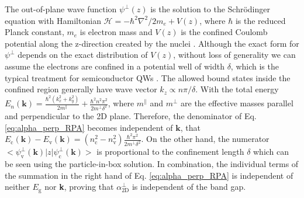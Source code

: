\documentclass[manuscript=suppinfo,email=true,hyperref=true,keywords=false]{achemso}
\begin{document}
The out-of-plane wave function $\psi^{\perp}(z)$ is the solution to the Schr\"{o}dinger equation with
Hamiltonian $\mathcal{H} = -\hbar^{2} \nabla^{2}/2m_{e} + V(z)$, where
$\hbar$ is the reduced Planck constant, $m_{e}$ is electron mass and
$V(z)$ is the confined Coulomb potential along the z-direction
created by the nuclei
\cite{davies_physics_1997,ihn_semiconductor_2009}. Although the exact
form for $\psi^{\perp}$ depends on the exact distribution of $V(z)$,
without loss of generality we can assume the electrons are confined in
a potential well of width $\delta$, which is the typical treatment for
semiconductor QWs \cite{ihn_semiconductor_2009,Fowler_1984,Maize_2011}. 
The allowed bound
states inside the confined region generally have wave vector
$k_{z} \propto n \pi / \delta$. With the total energy
$E_{n}(\mathbf{k}) = {\displaystyle \frac{\hbar^{2} (k_{x}^{2} +
    k_{y}^{2})}{2 m^{\parallel}} + \frac{\hbar^{2} n^{2} \pi^{2}}{2
    m^{\perp} \delta^{2}}}$, where $m^{\parallel}$ and $m^{\perp}$ are
the effective masses parallel and perpendicular to the 2D
plane. Therefore, the denominator of Eq. \ref{eq:alpha_perp_RPA} becomes independent of
$\mathbf{k}$, that
$E_{\mathrm{c}}(\mathbf{k}) - E_{\mathrm{v}}(\mathbf{k}) =
(n_{\mathrm{c}}^{2} - n_{\mathrm{v}}^{2}) {\displaystyle
  \frac{\hbar^{2} \pi^{2}}{2 m^{\perp} \delta^{2}}}$. On the other
hand, the numerator
$<\psi^{\perp}_{\mathrm{v}}(\mathbf{k})|z|\psi^{\perp}_{\mathrm{c}}(\mathbf{k})>$
is proportional to the confinement length $\delta$ which can be seen using the 
particle-in-box solution\cite{davies_physics_1997}. In combination,
the individual terms of the summation in the right hand of Eq. \ref{eq:alpha_perp_RPA} is
independent of neither $E_{\mathrm{g}}$ nor \textbf{k}, proving that
$\alpha_{\mathrm{2D}}^{\perp}$ is independent of the band gap.
%
\end{document}
